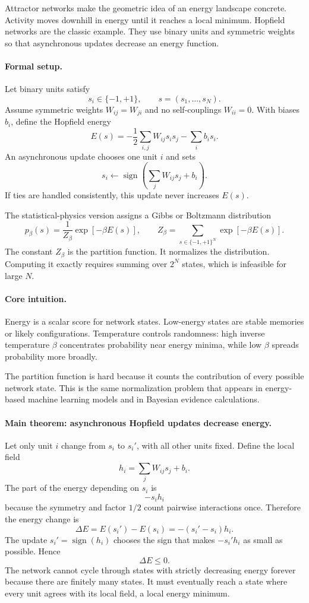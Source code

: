 Attractor networks make the geometric idea of an energy landscape concrete. Activity moves downhill in energy until it reaches a local minimum. Hopfield networks are the classic example. They use binary units and symmetric weights so that asynchronous updates decrease an energy function.

\paragraph{Formal setup.}
Let binary units satisfy
\[
s_i\in\{-1,+1\},\qquad s=(s_1,\ldots,s_N).
\]
Assume symmetric weights \(W_{ij}=W_{ji}\) and no self-couplings \(W_{ii}=0\). With biases \(b_i\), define the Hopfield energy
\[
\boxed{
E(s)=-\frac12\sum_{i,j}W_{ij}s_i s_j-\sum_i b_i s_i.
}
\]
An asynchronous update chooses one unit \(i\) and sets
\[
s_i\leftarrow \operatorname{sign}\left(\sum_j W_{ij}s_j+b_i\right).
\]
If ties are handled consistently, this update never increases \(E(s)\).

The statistical-physics version assigns a Gibbs or Boltzmann distribution
\[
\boxed{
p_\beta(s)=\frac{1}{Z_\beta}\exp[-\beta E(s)],
\qquad
Z_\beta=\sum_{s\in\{-1,+1\}^N}\exp[-\beta E(s)].
}
\]
The constant \(Z_\beta\) is the partition function. It normalizes the distribution. Computing it exactly requires summing over \(2^N\) states, which is infeasible for large \(N\).

\paragraph{Core intuition.}
Energy is a scalar score for network states. Low-energy states are stable memories or likely configurations. Temperature controls randomness: high inverse temperature \(\beta\) concentrates probability near energy minima, while low \(\beta\) spreads probability more broadly.

The partition function is hard because it counts the contribution of every possible network state. This is the same normalization problem that appears in energy-based machine learning models and in Bayesian evidence calculations.

\paragraph{Main theorem: asynchronous Hopfield updates decrease energy.}
Let only unit \(i\) change from \(s_i\) to \(s_i'\), with all other units fixed. Define the local field
\[
h_i=\sum_j W_{ij}s_j+b_i.
\]
The part of the energy depending on \(s_i\) is
\[
-s_i h_i
\]
because the symmetry and factor \(1/2\) count pairwise interactions once. Therefore the energy change is
\[
\Delta E=E(s_i')-E(s_i)=-(s_i'-s_i)h_i.
\]
The update \(s_i'=\operatorname{sign}(h_i)\) chooses the sign that makes \(-s_i'h_i\) as small as possible. Hence
\[
\Delta E\leq0.
\]
The network cannot cycle through states with strictly decreasing energy forever because there are finitely many states. It must eventually reach a state where every unit agrees with its local field, a local energy minimum.

